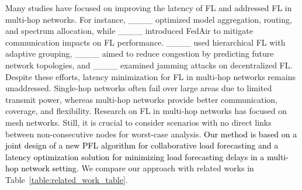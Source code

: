 Many studies have focused on improving the latency of  FL and addressed FL in multi-hop networks. For instance, ____ optimized model aggregation, routing, and spectrum allocation, while ____ introduced FedAir to mitigate communication impacts on FL performance. ____ used hierarchical FL with adaptive grouping, ____ aimed to reduce congestion by predicting future network topologies, and ____ examined jamming attacks on decentralized FL. Despite these efforts, latency minimization for  FL in multi-hop networks remains unaddressed. Single-hop networks often fail over large areas due to limited transmit power, whereas multi-hop networks provide better communication, coverage, and flexibility. Research on FL in multi-hop networks has focused on mesh networks. Still, it is crucial to consider scenarios with no direct links between non-consecutive nodes for worst-case analysis. \textcolor{black}{Our method is based on a joint design of a new PFL algorithm for collaborative load forecasting and a latency optimization solution for minimizing load forecasting delays in a multi-hop network setting}. We compare our approach with related works in Table~\ref{table:related_work_table}.
